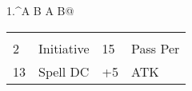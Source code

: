 \documentclass{article}
\begin{document}
\begin{adjustbox}{minipage=0.45\textwidth, margin=\fboxsep, bgimage=../images/texture2.pdf}
{\begin{minipage}[t][10.5in][t]{0.9\textwidth}
\begin{minipage}[t]{0.75\textwidth}
\begin{tabularx}{1.\textwidth}{^A B A B@{}}
                \end{tabularx}
                \begin{tabularx}{1.\textwidth}{A B A B@{}} 
                    \\
                    2 & Initiative & 15 & Pass Per \\ \hline
                    13 & Spell DC & +5 & ATK \\ \hline
                \end{tabularx}
            \end{minipage}        
        \end{minipage}
	}
\end{adjustbox}
\hspace{0.05\textwidth}
\end{document}
